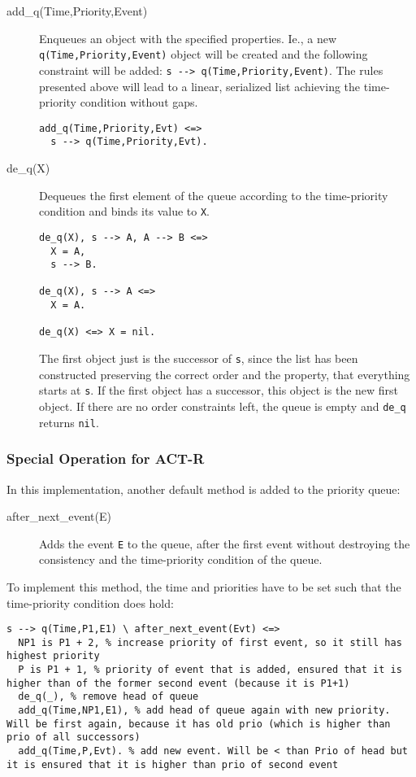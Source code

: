 \begin{description}
 \item[add\_q(Time,Priority,Event)] Enqueues an object with the specified properties. Ie., a new \verb|q(Time,Priority,Event)| object will be created and the following constraint will be added: \verb|s --> q(Time,Priority,Event)|. The rules presented above will lead to a linear, serialized list achieving the time-priority condition without gaps.
\begin{lstlisting}
add_q(Time,Priority,Evt) <=>
  s --> q(Time,Priority,Evt).
\end{lstlisting}
 \item[de\_q(X)] Dequeues the first element of the queue according to the time-priority condition and binds its value to \verb|X|.
\begin{lstlisting}
de_q(X), s --> A, A --> B <=>
  X = A,
  s --> B.

de_q(X), s --> A <=>
  X = A.  
  
de_q(X) <=> X = nil.
\end{lstlisting}

The first object just is the successor of \verb|s|, since the list has been constructed preserving the correct order and the property, that everything starts at \verb|s|. If the first object has a successor, this object is the new first object. If there are no order constraints left, the queue is empty and \verb|de_q| returns \verb|nil|.

\end{description}

\subsubsection{Special Operation for ACT-R}

In this implementation, another default method is added to the priority queue: 

\begin{description}
 \item[after\_next\_event(E)] Adds the event \verb|E| to the queue, after the first event without destroying the consistency and the time-priority condition of the queue.
\end{description}

To implement this method, the time and priorities have to be set such that the time-priority condition does hold:

\begin{lstlisting}
s --> q(Time,P1,E1) \ after_next_event(Evt) <=> 
  NP1 is P1 + 2, % increase priority of first event, so it still has highest priority
  P is P1 + 1, % priority of event that is added, ensured that it is higher than of the former second event (because it is P1+1)
  de_q(_), % remove head of queue
  add_q(Time,NP1,E1), % add head of queue again with new priority. Will be first again, because it has old prio (which is higher than prio of all successors)
  add_q(Time,P,Evt). % add new event. Will be < than Prio of head but it is ensured that it is higher than prio of second event
\end{lstlisting}

